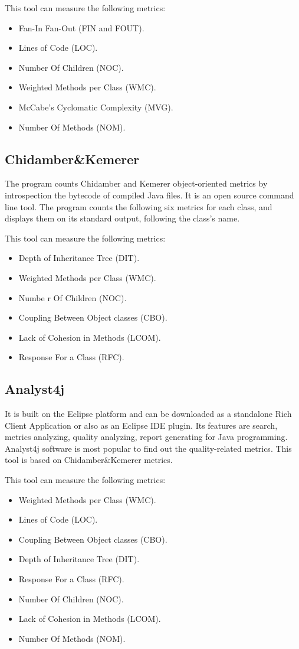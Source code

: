 This tool can measure the following metrics:
\begin{itemize}
	\item Fan-In Fan-Out (FIN and FOUT).
	\item Lines of Code (LOC). 
	\item Number Of Children (NOC).
	\item Weighted Methods per Class (WMC).
	\item McCabe's Cyclomatic Complexity (MVG).
	\item Number Of Methods (NOM).
\end{itemize}

\subsection{Chidamber\&Kemerer}

The program counts Chidamber and Kemerer object-oriented metrics by introspection the bytecode of compiled Java files. It is an open source command line tool. The program counts the following six metrics for each class, and displays them on its standard output, following the class's name.

This tool can measure the following metrics:

\begin{itemize}
	\item Depth of Inheritance Tree (DIT).
	\item Weighted Methods per Class (WMC).
	\item Numbe r Of Children (NOC).
	\item Coupling Between Object classes (CBO).
	\item Lack of Cohesion in Methods (LCOM).
	\item Response For a Class (RFC).
\end{itemize}

\subsection{Analyst4j}
It is built on the Eclipse platform and can be downloaded as a standalone Rich Client Application or also as an Eclipse
IDE plugin. Its features are search, metrics analyzing, quality analyzing, report generating for Java programming.
Analyst4j software is most popular to find out the quality-related metrics. This tool is based on Chidamber\&Kemerer metrics.

This tool can measure the following metrics:
\begin{itemize}
	\item Weighted Methods per Class (WMC).
	\item Lines of Code (LOC). 
	\item Coupling Between Object classes (CBO).
	\item Depth of Inheritance Tree (DIT).
	\item Response For a Class (RFC).
	\item Number Of Children (NOC).
	\item Lack of Cohesion in Methods (LCOM).
	\item Number Of Methods (NOM).
\end{itemize}

